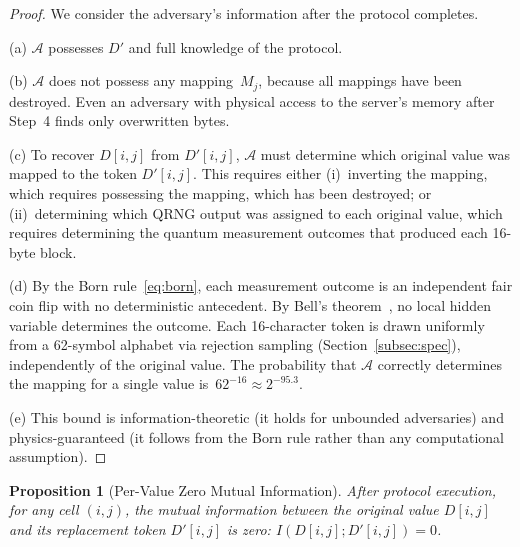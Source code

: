 \documentclass[journal]{IEEEtran}
\newtheorem{proposition}[theorem]{Proposition}
\begin{document}
\begin{proof}
We consider the adversary's information after the protocol completes.

(a) $\mathcal{A}$ possesses $D'$ and full knowledge of the protocol.

(b) $\mathcal{A}$ does not possess any mapping~$M_j$, because all mappings have been destroyed. Even an adversary with physical access to the server's memory after Step~4 finds only overwritten bytes.

(c) To recover $D[i,j]$ from $D'[i,j]$, $\mathcal{A}$ must determine which original value was mapped to the token $D'[i,j]$. This requires either (i)~inverting the mapping, which requires possessing the mapping, which has been destroyed; or (ii)~determining which QRNG output was assigned to each original value, which requires determining the quantum measurement outcomes that produced each 16-byte block.

(d) By the Born rule~\eqref{eq:born}, each measurement outcome is an independent fair coin flip with no deterministic antecedent. By Bell's theorem~\cite{bell1964epr}, no local hidden variable determines the outcome. Each 16-character token is drawn uniformly from a 62-symbol alphabet via rejection sampling (Section~\ref{subsec:spec}), independently of the original value. The probability that $\mathcal{A}$ correctly determines the mapping for a single value is~$62^{-16} \approx 2^{-95.3}$.

(e) This bound is information-theoretic (it holds for unbounded adversaries) and physics-guaranteed (it follows from the Born rule rather than any computational assumption).
\end{proof}

\begin{proposition}[Per-Value Zero Mutual Information]
\label{prop:mi}
After protocol execution, for any cell $(i,j)$, the mutual information between the original value $D[i,j]$ and its replacement token $D'[i,j]$ is zero: $I(D[i,j]; D'[i,j]) = 0$.
\end{proposition}
\end{document}
